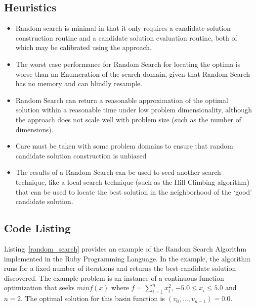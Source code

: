 \subsection{Heuristics}
\begin{itemize}
	\item Random search is minimal in that it only requires a candidate solution construction routine and a candidate solution evaluation routine, both of which may be calibrated using the approach.
	\item The worst case performance for Random Search for locating the optima is worse than an Enumeration of the search domain, given that Random Search has no memory and can blindly resample.
	\item Random Search can return a reasonable approximation of the optimal solution within a reasonable time under low problem dimensionality, although the approach does not scale well with problem size (such as the number of dimensions).
	\item Care must be taken with some problem domains to ensure that random candidate solution construction is  unbiased
	\item The results of a Random Search can be used to seed another search technique, like a local search technique (such as the Hill Climbing algorithm) that can be used to locate the best solution in the neighborhood of the `good' candidate solution.
\end{itemize}

\subsection{Code Listing}
\label{sec:code}
Listing~\ref{random_search} provides an example of the Random Search Algorithm implemented in the Ruby Programming Language. 
In the example, the algorithm runs for a fixed number of iterations and returns the best candidate solution discovered. 
The example problem is an instance of a continuous function optimization that seeks $min f(x)$ where $f=\sum_{i=1}^n x_{i}^2$, $-5.0\leq x_i \leq 5.0$ and $n=2$. The optimal solution for this basin function is $(v_0,\ldots,v_{n-1})=0.0$.

